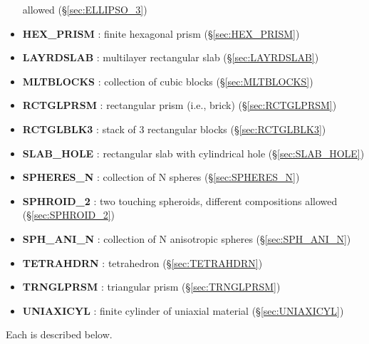 \begin{itemize}
                         allowed (\S\ref{sec:ELLIPSO_3})
\item {\bf HEX\_PRISM} : finite hexagonal prism (\S\ref{sec:HEX_PRISM})
\item {\bf LAYRDSLAB} : multilayer rectangular slab (\S\ref{sec:LAYRDSLAB})
\item {\bf MLTBLOCKS} : collection of cubic blocks (\S\ref{sec:MLTBLOCKS})
\item {\bf RCTGLPRSM} : rectangular prism (i.e., brick) (\S\ref{sec:RCTGLPRSM})
\item {\bf RCTGLBLK3} : stack of 3 rectangular blocks (\S\ref{sec:RCTGLBLK3})
\item {\bf SLAB\_HOLE} : rectangular slab with cylindrical hole
                         (\S\ref{sec:SLAB_HOLE})
\item {\bf SPHERES\_N} : collection of N spheres (\S\ref{sec:SPHERES_N})
\item {\bf SPHROID\_2} : two touching spheroids, different compositions allowed
                         (\S\ref{sec:SPHROID_2})
\item {\bf SPH\_ANI\_N} : collection of N anisotropic spheres 
                          (\S\ref{sec:SPH_ANI_N})
\item {\bf TETRAHDRN} : tetrahedron (\S\ref{sec:TETRAHDRN})
\item {\bf TRNGLPRSM} : triangular prism (\S\ref{sec:TRNGLPRSM})
\item {\bf UNIAXICYL} : finite cylinder of uniaxial material 
                        (\S\ref{sec:UNIAXICYL})
\end{itemize}
Each is described below.

